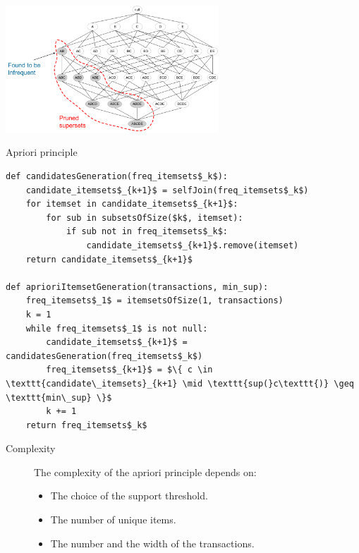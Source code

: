 \begin{example} \phantom{}
    \begin{center}
        \includegraphics[width=0.6\textwidth]{img/itemset_apriori.png}
    \end{center}
\end{example}

\begin{algorithm}[H]
\caption{Apriori principle}
\begin{lstlisting}[mathescape=true]
def candidatesGeneration(freq_itemsets$_k$):
    candidate_itemsets$_{k+1}$ = selfJoin(freq_itemsets$_k$)
    for itemset in candidate_itemsets$_{k+1}$:
        for sub in subsetsOfSize($k$, itemset):
            if sub not in freq_itemsets$_k$:
                candidate_itemsets$_{k+1}$.remove(itemset)
    return candidate_itemsets$_{k+1}$

def aprioriItemsetGeneration(transactions, min_sup):
    freq_itemsets$_1$ = itemsetsOfSize(1, transactions)
    k = 1
    while freq_itemsets$_1$ is not null:
        candidate_itemsets$_{k+1}$ = candidatesGeneration(freq_itemsets$_k$)
        freq_itemsets$_{k+1}$ = $\{ c \in \texttt{candidate\_itemsets}_{k+1} \mid \texttt{sup(}c\texttt{)} \geq \texttt{min\_sup} \}$
        k += 1
    return freq_itemsets$_k$
\end{lstlisting}
\end{algorithm}

\begin{description}
    \item[Complexity]
        The complexity of the apriori principle depends on:
        \begin{itemize}
            \item The choice of the support threshold.
            \item The number of unique items.
            \item The number and the width of the transactions.
        \end{itemize}
\end{description}



